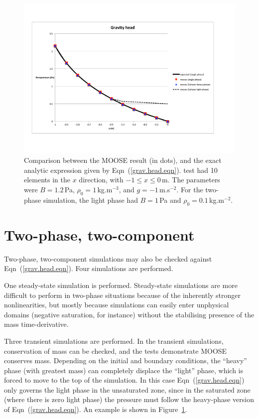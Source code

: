 \begin{figure}[htb]
\centering
\includegraphics[width=15cm]{gravity_fig.pdf}
\caption{Comparison between the MOOSE result (in dots), and the
  exact analytic expression given by Eqn~(\ref{grav.head.eqn}).
  test had 10 elements in the $x$ direction, with $-1\leq x \leq
  0$\,m.  The parameters were $B=1.2$\,Pa, $\rho_{0}=1$\,kg.m$^{-3}$,
  and $g=-1$\,m.s$^{-2}$.  For the two-phase simulation, the light
  phase had $B=1$\,Pa and $\rho_{0}=0.1$\,kg.m$^{-2}$.}
\label{gh.fig}
\end{figure}

\section{Two-phase, two-component}
\label{2phase.sec}

Two-phase, two-component simulations may also be checked against
Eqn~(\ref{grav.head.eqn}).  Four simulations are performed.

One steady-state simulation is performed.  Steady-state simulations are more
difficult to perform in two-phase situations because of the inherently
stronger nonlinearities, but mostly because simulations can easily enter
unphysical domains (negative saturation, for instance) without the stabilising
presence of the mass time-derivative.

Three transient simulations are performed.  In the
transient simulations, conservation of mass can be checked, and the
tests demonstrate MOOSE conserves mass.  Depending on the initial and
boundary conditions, the ``heavy'' phase (with greatest mass) can
completely displace the ``light'' phase, which is forced to move to
the top of the simulation.  In this case Eqn~(\ref{grav.head.eqn})
only governs the light phase in the unsaturated zone, since in the
saturated zone (where there is zero light phase) the pressure must
follow the heavy-phase version of Eqn~(\ref{grav.head.eqn}).  An
example is shown in Figure~\ref{gh.fig}.
